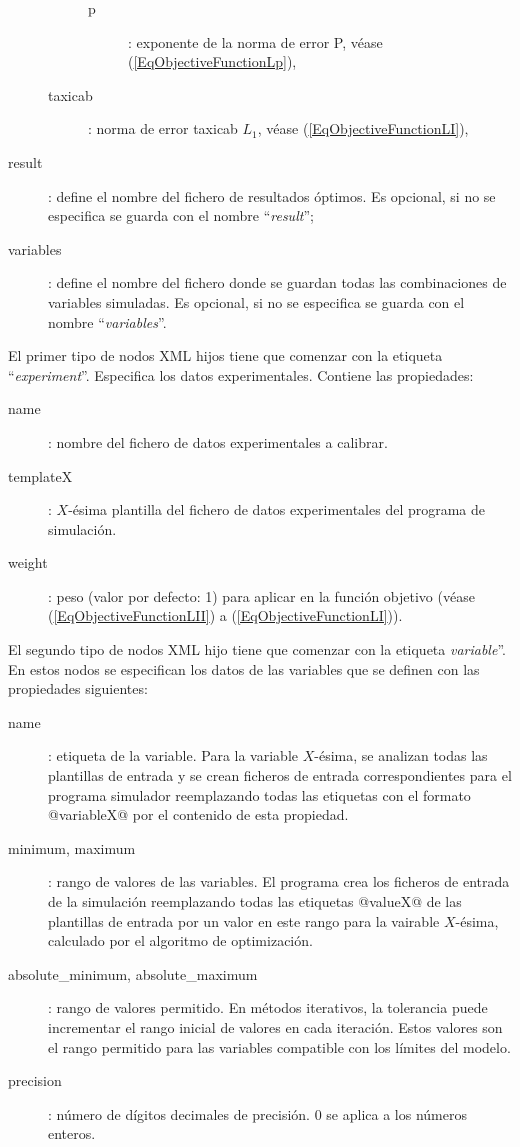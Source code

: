 \documentclass[a4paper]{report}
\begin{document}
\begin{description}
\begin{description}
\begin{description}
				\item[p]: exponente de la norma de error P, véase
					(\ref{EqObjectiveFunctionLp}),
			\end{description}
			\item[taxicab]: norma de error taxicab $L_1$, véase
				(\ref{EqObjectiveFunctionLI}),
		\end{description}
	\item[result]: define el nombre del fichero de resultados óptimos. Es
		opcional, si no se especifica se guarda con el nombre ``\emph{result}'';
	\item[variables]: define el nombre del fichero donde se guardan todas
		las combinaciones de variables simuladas. Es opcional, si no se
		especifica se guarda con el nombre ``\emph{variables}''.
\end{description}

El primer tipo de nodos XML hijos tiene que comenzar con la etiqueta
``\emph{experiment}''. Especifica los datos experimentales. Contiene las
propiedades:
\begin{description}
	\item[name]: nombre del fichero de datos experimentales a calibrar.
	\item[templateX]: $X$-ésima plantilla del fichero de datos experimentales
		del programa de simulación.
	\item[weight]: peso (valor por defecto: 1) para aplicar en la función
		objetivo (véase (\ref{EqObjectiveFunctionLII}) a
		(\ref{EqObjectiveFunctionLI})).
\end{description}

El segundo tipo de nodos XML hijo tiene que comenzar con la etiqueta
\emph{variable}''. En estos nodos se especifican los datos de las variables que
se definen con las propiedades siguientes:
\begin{description}
	\item[name]: etiqueta de la variable. Para la variable $X$-ésima, se
		analizan todas las plantillas de entrada y se crean ficheros de entrada
		correspondientes para el programa simulador reemplazando todas las
		etiquetas con el formato @variableX@ por el contenido de esta propiedad.
\item[minimum, maximum]: rango de valores de las variables. El programa crea los
	ficheros de entrada de la simulación reemplazando todas las etiquetas
	@valueX@ de las plantillas de entrada por un valor en este rango para la
	vairable $X$-ésima, calculado por el algoritmo de optimización.
\item[absolute\_minimum, absolute\_maximum]: rango de valores permitido. En
	métodos iterativos, la tolerancia puede incrementar el rango inicial de
	valores en cada iteración. Estos valores son el rango permitido para las
	variables compatible con los límites del modelo.
\item[precision]: número de dígitos decimales de precisión. 0 se aplica a los
	números enteros.
\end{description}
\end{document}
